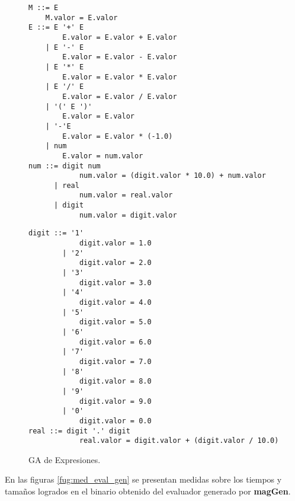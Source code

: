 \documentclass[a4paper]{article}
\newcommand{\maggen}{\textbf{magGen}}
\begin{document}
\begin{figure}[!hbtp]
\vspace{-0.5cm}
\begin{minipage}{0.47\textwidth}
\begin{center} 
\begin{lstlisting}[columns=fullflexible, backgroundcolor=\color{white}]
M ::= E
    M.valor = E.valor
E ::= E '+' E
		E.valor = E.valor + E.valor 
    | E '-' E
        E.valor = E.valor - E.valor 
    | E '*' E
        E.valor = E.valor * E.valor 
    | E '/' E
        E.valor = E.valor / E.valor 
    | '(' E ')'
        E.valor = E.valor 
    | '-'E
        E.valor = E.valor * (-1.0)
    | num
        E.valor = num.valor
num ::= digit num
            num.valor = (digit.valor * 10.0) + num.valor
	  | real
            num.valor = real.valor
      | digit
            num.valor = digit.valor
\end{lstlisting} 
\end{center}
\end{minipage}
\hspace{0.28cm}\begin{minipage}{0.49\textwidth}
\begin{center}
\begin{lstlisting}[columns=fullflexible, backgroundcolor=\color{white}]
digit ::= '1'
            digit.valor = 1.0
        | '2'
            digit.valor = 2.0
        | '3'
            digit.valor = 3.0
        | '4'
            digit.valor = 4.0
        | '5'
            digit.valor = 5.0
        | '6'
            digit.valor = 6.0
        | '7'
            digit.valor = 7.0
        | '8'
            digit.valor = 8.0
        | '9'
            digit.valor = 9.0
        | '0'
            digit.valor = 0.0
real ::= digit '.' digit
            real.valor = digit.valor + (digit.valor / 10.0)
\end{lstlisting} 
\end{center}
\end{minipage}
\vspace{-0,5cm}
\caption{\label{fig:eje_expresion} GA de Expresiones.}
\end{figure}

En las figuras \ref{fug:med_eval_gen} se presentan medidas sobre los tiempos y tamaños logrados en el binario obtenido del evaluador generado por \maggen. 
\end{document}
